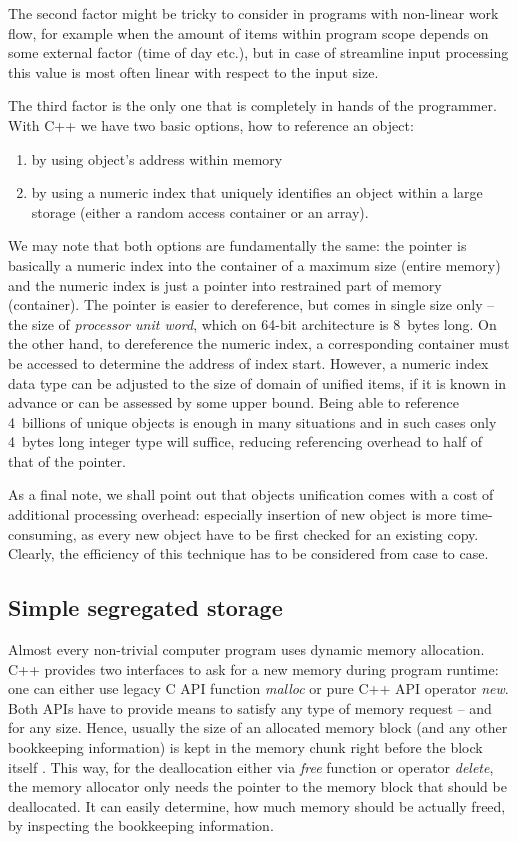 The second factor might be tricky to consider in programs with non-linear work flow,
for example when the amount of items within program scope depends on some external
factor (time of day etc.), but in case of streamline input processing this value is
most often linear with respect to the input size.

The third factor is the only one that is completely in hands of the programmer.
With C++ we have two basic options, how to reference an object:
\begin{enumerate}
  \item by using object's address within memory
  \item by using a numeric index that uniquely identifies an object within a large storage
  (either a random access container or an array).
\end{enumerate}

We may note that both options are fundamentally the same:
the pointer is basically a numeric index into the container of a maximum size (entire memory)
and the numeric index is just a pointer into restrained part of memory (container).
The pointer is easier to dereference, but comes in single size only -- the size of
\emph{processor unit word}, which on 64-bit architecture is 8~bytes long.
On the other hand, to dereference the numeric index, a corresponding container must be
accessed to determine the address of index start.
However, a numeric index data type can be adjusted to the size of domain of unified items,
if it is known in advance or can be assessed by some upper bound.
Being able to reference 4~billions of unique objects is enough in many situations and
in such cases only 4~bytes long integer type will suffice, reducing referencing overhead
to half of that of the pointer.

As a final note, we shall point out that objects unification comes with a cost of
additional processing overhead: especially insertion of new object is more time-consuming,
as every new object have to be first checked for an existing copy.
Clearly, the efficiency of this technique has to be considered from case to case.

\subsection{Simple segregated storage}
\label{sec:simple-segregated-storage}

Almost every non-trivial computer program uses dynamic memory allocation.
C++ provides two interfaces to ask for a new memory during program runtime:
one can either use legacy C API function \emph{malloc} or pure C++ API operator \emph{new}.
Both APIs have to provide means to satisfy any type of memory request -- and for any size.
Hence, usually the size of an allocated memory block (and any other bookkeeping information) is
kept in the memory chunk right before the block itself \citep[Item 10]{meyers:effective-cpp}.
This way, for the deallocation either via \emph{free} function or operator \emph{delete},
the memory allocator only needs the pointer to the memory block that should be deallocated.
It can easily determine, how much memory should be actually freed, by inspecting the
bookkeeping information.

